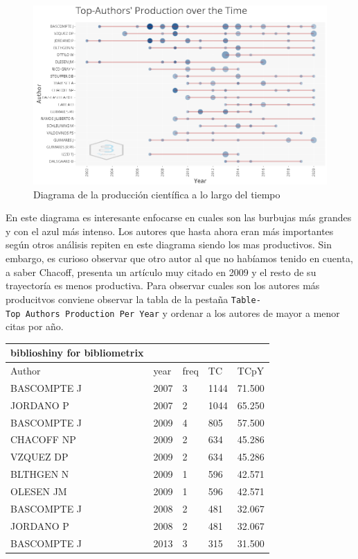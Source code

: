 \documentclass[
]{article}
\begin{document}
\begin{figure}
\centering
\includegraphics{TopAuthorsProductionOverTime.png}
\caption{Diagrama de la producción científica a lo largo del tiempo}
\end{figure}

En este diagrama es interesante enfocarse en cuales son las burbujas más
grandes y con el azul más intenso. Los autores que hasta ahora eran más
importantes según otros análisis repiten en este diagrama siendo los mas
productivos. Sin embargo, es curioso observar que otro autor al que no
habíamos tenido en cuenta, a saber Chacoff, presenta un artículo muy
citado en 2009 y el resto de su trayectoría es menos productiva. Para
observar cuales son los autores más producitvos conviene observar la
tabla de la pestaña \texttt{Table-Top\ Authors\ Production\ Per\ Year} y
ordenar a los autores de mayor a menor citas por año.

\begin{longtable}[]{@{}lllll@{}}
\toprule
biblioshiny for bibliometrix & & & & \\
\midrule
\endhead
Author & year & freq & TC & TCpY \\
BASCOMPTE J & 2007 & 3 & 1144 & 71.500 \\
JORDANO P & 2007 & 2 & 1044 & 65.250 \\
BASCOMPTE J & 2009 & 4 & 805 & 57.500 \\
CHACOFF NP & 2009 & 2 & 634 & 45.286 \\
VZQUEZ DP & 2009 & 2 & 634 & 45.286 \\
BLTHGEN N & 2009 & 1 & 596 & 42.571 \\
OLESEN JM & 2009 & 1 & 596 & 42.571 \\
BASCOMPTE J & 2008 & 2 & 481 & 32.067 \\
JORDANO P & 2008 & 2 & 481 & 32.067 \\
BASCOMPTE J & 2013 & 3 & 315 & 31.500 \\
\bottomrule
\end{longtable}
\end{document}
